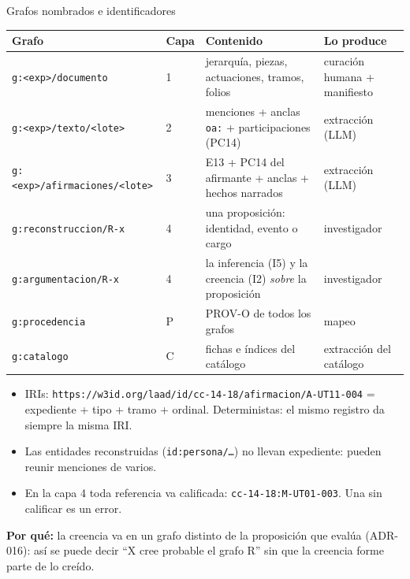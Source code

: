 \documentclass[aspectratio=169,10pt]{beamer}
\newcommand{\ttt}[1]{\texttt{\small #1}}
\newcommand{\porque}[1]{\par\smallskip\colorbox{ocre!10}{\parbox{\dimexpr\linewidth-2\fboxsep}{\footnotesize\textbf{Por qué:} #1}}}
\begin{document}
\begin{frame}[shrink=7]{Grafos nombrados e identificadores}
\scriptsize
\begin{tabular}{@{}p{4.1cm}p{0.6cm}p{5.4cm}p{2.9cm}@{}}
\toprule
Grafo & Capa & Contenido & Lo produce \\
\midrule
\ttt{g:<exp>/documento} & 1 & jerarquía, piezas, actuaciones, tramos, folios & curación humana + manifiesto \\
\ttt{g:<exp>/texto/<lote>} & 2 & menciones + anclas \ttt{oa:} + participaciones (PC14) & extracción (LLM) \\
\ttt{g:<exp>/afirmaciones/<lote>} & 3 & E13 + PC14 del afirmante + anclas + hechos narrados & extracción (LLM) \\
\ttt{g:reconstruccion/R-x} & 4 & una proposición: identidad, evento o cargo & investigador \\
\ttt{g:argumentacion/R-x} & 4 & la inferencia (I5) y la creencia (I2) \emph{sobre} la proposición & investigador \\
\ttt{g:procedencia} & P & PROV-O de todos los grafos & mapeo \\
\ttt{g:catalogo} & C & fichas e índices del catálogo & extracción del catálogo \\
\bottomrule
\end{tabular}

\medskip
\begin{itemize}\footnotesize
\item IRIs: \ttt{https://w3id.org/laad/id/cc-14-18/afirmacion/A-UT11-004} = expediente + tipo + tramo + ordinal.
      Deterministas: el mismo registro da siempre la misma IRI.
\item Las entidades reconstruidas (\ttt{id:persona/…}) \alert{no} llevan expediente: pueden reunir menciones de varios.
\item En la capa 4 toda referencia va calificada: \ttt{cc-14-18:M-UT01-003}. Una sin calificar es un error.
\end{itemize}
\porque{la creencia va en un grafo distinto de la proposición que evalúa (ADR-016): así se puede decir \enquote{X cree
probable el grafo R} sin que la creencia forme parte de lo creído.}
\end{frame}
\end{document}
